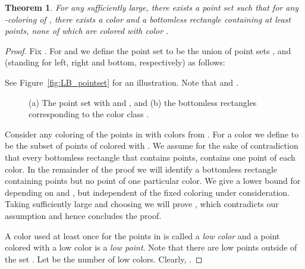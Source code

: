 \documentclass[11pt,a4paper]{amsart}
\theoremstyle{plain}
\newtheorem{theorem}{Theorem}[section]
\theoremstyle{definition}
\begin{document}
\begin{theorem}
For any  sufficiently large, there exists a point set  such that for any -coloring of , 
there exists a color  and a bottomless rectangle containing at least  points, 
none of which are colored with color .
\end{theorem}
\begin{proof}
Fix .
For  and  we define the point set  to be the union of point sets ,  and  (standing for left, right and bottom, respectively) as follows:

See Figure~\ref{fig:LB_pointset} for an illustration.
Note that  and .

\begin{figure}[htb]
 \centering
 \hfill
 \caption{(a) The point set  with  and , and (b) the bottomless rectangles  corresponding to the color class .}
\end{figure}

Consider any coloring of the points in  with colors from . 
For a color  we define  to be the subset of points of  colored with . 
We assume for the sake of contradiction that every bottomless rectangle that contains  points, contains one point of each color.
In the remainder of the proof we will identify a bottomless rectangle containing  points but no point of one particular color.
We give a lower bound for  depending on  and , but independent of the fixed coloring under consideration. 
Taking sufficiently large  and choosing  we will prove , which contradicts our assumption and hence concludes the proof.

A color used at least once for the points in  is called a \emph{low color} and a point colored with a low color is a \emph{low point}. 
Note that there are low points outside of the set .
Let  be the number of low colors. 
Clearly, .


\end{proof}
\end{document}
